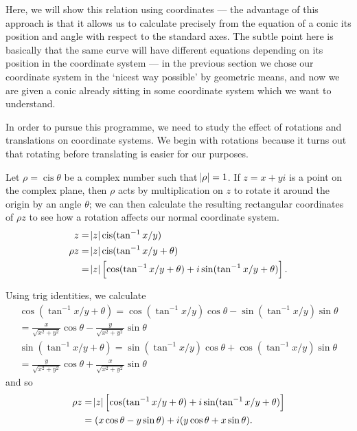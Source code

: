 \documentclass[a4paper,leqno,10pt]{article}
\theoremstyle{exercise}
\theoremstyle{plain}
\theoremstyle{definition}
\theoremstyle{remark}
\DeclareMathOperator{\cis}{cis}
\begin{document}
Here, we will show this relation using coordinates --- the advantage of this approach is that it allows us to calculate precisely
from the equation of a conic its position and angle with respect to the standard axes. The subtle point here is basically that the
same curve will have different equations depending on its position in the coordinate system --- in the previous section we chose our
coordinate system in the `nicest way possible' by geometric means, and now we are given a conic already sitting in some coordinate
system which we want to understand.

In order to pursue this programme, we need to study the effect of rotations and translations on coordinate systems. We
begin with rotations because it turns out that rotating before translating is easier for our purposes.

Let $ \rho = \cis \theta $ be a complex number such that $ \abs{\rho} = 1 $. If $ z = x + yi $ is a point on the complex plane,
then $ \rho $ acts by multiplication on $ z $ to rotate it around the origin by an angle $ \theta $; we can then calculate
the resulting rectangular coordinates of $ \rho z $ to see how a rotation affects our normal coordinate system.
\begin{align*}
  z &= \abs{z} \cis(\tan^{-1} x/y)\\
  \rho z &= \abs{z} \cis(\tan^{-1} x/y + \theta)\\
         &= \abs{z} \left[\cos(\tan^{-1} x/y + \theta) + i\sin(\tan^{-1} x/y + \theta)\right].
\end{align*}

Using trig identities, we calculate
\begin{align*}
  \cos(\tan^{-1} x/y + \theta) = \cos(\tan^{-1} x/y) \cos \theta - \sin(\tan^{-1} x/y) \sin \theta\\
                               = \frac{x}{\sqrt{x^2 + y^2}} \cos \theta - \frac{y}{\sqrt{x^2 + y^2}} \sin \theta\\
  \sin(\tan^{-1} x/y + \theta) = \sin(\tan^{-1} x/y) \cos \theta + \cos(\tan^{-1} x/y) \sin \theta\\
                               = \frac{y}{\sqrt{x^2 + y^2}} \cos \theta + \frac{x}{\sqrt{x^2 + y^2}} \sin \theta
\end{align*}
and so
\begin{align*}
  \rho z &= \abs{z} \left[\cos(\tan^{-1} x/y + \theta) + i\sin(\tan^{-1} x/y + \theta)\right]\\
         &= (x \cos \theta - y \sin \theta) + i(y \cos \theta + x \sin \theta).
\end{align*}
\end{document}
